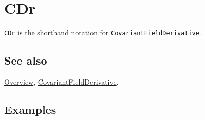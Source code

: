 \documentclass[../FeynCalcManual.tex]{subfiles}
\begin{document}
\hypertarget{cdr}{
\section{CDr}\label{cdr}}

\texttt{CDr} is the shorthand notation for
\texttt{CovariantFieldDerivative}.

\subsection{See also}

\hyperlink{toc}{Overview},
\hyperlink{covariantfieldderivative}{CovariantFieldDerivative}.

\subsection{Examples}
\end{document}
